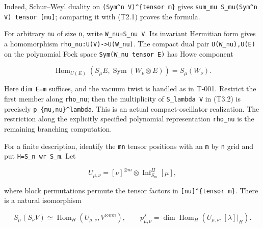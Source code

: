 \documentclass[
  10pt,
]{article}
\begin{document}
Indeed, Schur--Weyl duality on
\texttt{\small (\allowbreak{}Sym\textasciicircum{}n V)\allowbreak{}\textasciicircum{}\{tensor m\}}
gives
\texttt{\small sum\_\allowbreak{}mu S\_\allowbreak{}mu(\allowbreak{}Sym\textasciicircum{}n V)\allowbreak{} tensor [\allowbreak{}mu]\allowbreak{}};
comparing it with (T2.1) proves the formula.

For arbitrary \texttt{\small nu} of size \texttt{\small n}, write
\texttt{\small W\_\allowbreak{}nu=\allowbreak{}S\_\allowbreak{}nu V}.
Its invariant Hermitian form gives a homomorphism
\texttt{\small rho\_\allowbreak{}nu:\allowbreak{}U(\allowbreak{}V)\allowbreak{}-\allowbreak{}>U(\allowbreak{}W\_\allowbreak{}nu)\allowbreak{}}.
The compact dual pair
\texttt{\small U(\allowbreak{}W\_\allowbreak{}nu)\allowbreak{},\allowbreak{}U(\allowbreak{}E)\allowbreak{}}
on the polynomial Fock space
\texttt{\small Sym(\allowbreak{}W\_\allowbreak{}nu tensor E)\allowbreak{}}
has Howe component

\[
\operatorname{Hom}_{U(E)}(S_\mu E,
\operatorname{Sym}(W_\nu\otimes E))=S_\mu(W_\nu).
\tag{T3.2}
\]

Here \texttt{\small dim E=\allowbreak{}m} suffices, and the vacuum twist
is handled as in T-001. Restrict the first member along
\texttt{\small rho\_\allowbreak{}nu}; then the multiplicity of
\texttt{\small S\_\allowbreak{}lambda V} in (T3.2) is precisely
\texttt{\small p\_\allowbreak{}\{mu,\allowbreak{}nu\}\textasciicircum{}lambda}.
This is an actual compact-oscillator realization. The restriction along
the explicitly specified polynomial representation
\texttt{\small rho\_\allowbreak{}nu} is the remaining branching
computation.

For a finite description, identify the \texttt{\small mn} tensor
positions with an \texttt{\small m} by \texttt{\small n} grid and put
\texttt{\small H=\allowbreak{}S\_\allowbreak{}n wr S\_\allowbreak{}m}.
Let

\[
U_{\mu,\nu}=[\nu]^{\otimes m}\otimes\operatorname{Inf}_{S_m}^H[\mu],
\]

where block permutations permute the tensor factors in
\texttt{\small [\allowbreak{}nu]\allowbreak{}\textasciicircum{}\{tensor m\}}.
There is a natural isomorphism

\[
S_\mu(S_\nu V)\simeq
\operatorname{Hom}_{H}(U_{\mu,\nu},V^{\otimes mn}),
\qquad
p_{\mu,\nu}^\lambda=
\dim\operatorname{Hom}_H(U_{\mu,\nu},[\lambda]|_H).
\tag{T3.3}
\]
\end{document}
